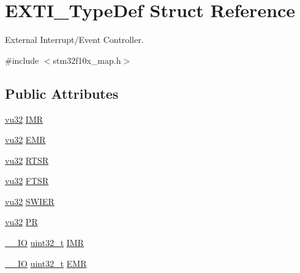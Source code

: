 \hypertarget{struct_e_x_t_i___type_def}{}\section{E\+X\+T\+I\+\_\+\+Type\+Def Struct Reference}
\label{struct_e_x_t_i___type_def}


External Interrupt/\+Event Controller.  




{\ttfamily \#include $<$stm32f10x\+\_\+map.\+h$>$}

\subsection*{Public Attributes}
\begin{DoxyCompactItemize}
\item 
\hyperlink{agilefox_2library_2inc_2stm32f10x__type_8h_a6e2761f0a1011f84ed96b946f2c8a563}{vu32} \hyperlink{struct_e_x_t_i___type_def_ae89d6fa0b34ed153e3c76e96dc2397ff}{I\+MR}
\item 
\hyperlink{agilefox_2library_2inc_2stm32f10x__type_8h_a6e2761f0a1011f84ed96b946f2c8a563}{vu32} \hyperlink{struct_e_x_t_i___type_def_a4cd1dd7eb440dc5701f16c827e8356fa}{E\+MR}
\item 
\hyperlink{agilefox_2library_2inc_2stm32f10x__type_8h_a6e2761f0a1011f84ed96b946f2c8a563}{vu32} \hyperlink{struct_e_x_t_i___type_def_a4c6651ca0f67b776fc82124489137a25}{R\+T\+SR}
\item 
\hyperlink{agilefox_2library_2inc_2stm32f10x__type_8h_a6e2761f0a1011f84ed96b946f2c8a563}{vu32} \hyperlink{struct_e_x_t_i___type_def_ade6114dee9f209fd01d5738d57e7968b}{F\+T\+SR}
\item 
\hyperlink{agilefox_2library_2inc_2stm32f10x__type_8h_a6e2761f0a1011f84ed96b946f2c8a563}{vu32} \hyperlink{struct_e_x_t_i___type_def_ab07004687cf077d41614786cf297c7bc}{S\+W\+I\+ER}
\item 
\hyperlink{agilefox_2library_2inc_2stm32f10x__type_8h_a6e2761f0a1011f84ed96b946f2c8a563}{vu32} \hyperlink{struct_e_x_t_i___type_def_a1f77bea5b9848f45f2c77095a4db92dd}{PR}
\item 
\hyperlink{group___c_m_s_i_s___c_m3__core__definitions_gaec43007d9998a0a0e01faede4133d6be}{\+\_\+\+\_\+\+IO} \hyperlink{_p_e___types_8h_a33594304e786b158f3fb30289278f5af}{uint32\+\_\+t} \hyperlink{struct_e_x_t_i___type_def_a17d061db586d4a5aa646b68495a8e6a4}{I\+MR}
\item 
\hyperlink{group___c_m_s_i_s___c_m3__core__definitions_gaec43007d9998a0a0e01faede4133d6be}{\+\_\+\+\_\+\+IO} \hyperlink{_p_e___types_8h_a33594304e786b158f3fb30289278f5af}{uint32\+\_\+t} \hyperlink{struct_e_x_t_i___type_def_a9c5bff67bf9499933959df7eb91a1bd6}{E\+MR}

\end{DoxyCompactItemize}
